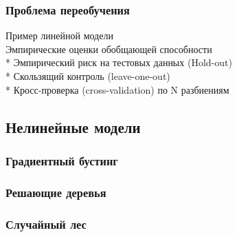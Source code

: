\subsubsection{Проблема переобучения}

Пример линейной модели\\

Эмпирические оценки обобщающей способности\\
* Эмпирический риск на тестовых данных (Hold-out)\\
* Скользящий контроль (leave-one-out)\\
* Кросс-проверка (cross-validation) по N разбиениям\\

\subsection{Нелинейные модели}

\subsubsection{Градиентный бустинг}

\subsubsection{Решающие деревья}

\subsubsection{Случайный лес}
